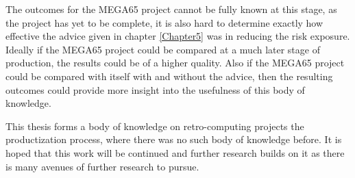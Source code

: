 The outcomes for the MEGA65 project cannot be fully known at this stage, as the project has yet to be complete, it is also hard to determine exactly how effective the advice given in chapter \ref{Chapter5} was in reducing the risk exposure. Ideally if the MEGA65 project could be compared at a much later stage of production, the results could be of a higher quality. Also if the MEGA65 project could be compared with itself with and without the advice, then the resulting outcomes could provide more insight into the usefulness of this body of knowledge.

This thesis forms a body of knowledge on retro-computing projects the productization process, where there was no such body of knowledge before. It is hoped that this work will be continued and further research builds on it as there is many avenues of further research to pursue.